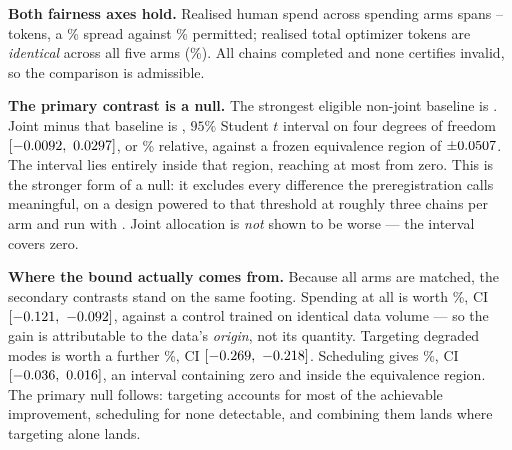 \documentclass{article}
\begin{document}
\textbf{Both fairness axes hold.} Realised human spend across spending arms spans
\PilotMatchedLow{}--\PilotMatchedHigh{} tokens, a \PilotHumanSpreadPct\% spread against
\PilotSpreadPermittedPct\% permitted; realised total optimizer tokens are \emph{identical}
across all five arms (\PilotTotalSpreadExactPct\%). All \PilotChains{} chains completed and
none certifies invalid, so the comparison is admissible.

\begin{table}[t]
\centering
\caption{\textbf{Targeting bounds the failure; scheduling does not.} All arms are matched on
both budget axes, so every row is comparable. AUC regret is the area under the
generation-wise held-out NLL-regret curve against each chain's own generation~0; tail
retention is the confirmatory outcome at the final generation. Bold marks the best value per
column, with both arms bolded where they tie at displayed precision --- selection-only and
joint are indistinguishable on both outcomes.}
\label{tab:results}
{\small}
\end{table}

\textbf{The primary contrast is a null.} The strongest eligible non-joint baseline is
\PilotPrimaryBaseline{}. Joint minus that baseline is \PilotPrimaryMean{}, $95\%$ Student
$t$ interval on four degrees of freedom $[\PilotPrimaryLow,\allowbreak\ \PilotPrimaryHigh]$, or
\PilotPrimaryPct\% relative, against a frozen equivalence region of
$\pm0.0507{}$. The interval lies entirely inside that region, reaching at most
\PilotPrimaryReach{} from zero. This is the stronger form of a null: it excludes every
difference the preregistration calls meaningful, on a design powered to that threshold at
roughly three chains per arm and run with \PilotSeeds{}. Joint allocation is \emph{not}
shown to be worse --- the interval covers zero.

\textbf{Where the bound actually comes from.} Because all arms are matched, the secondary
contrasts stand on the same footing. Spending at all is worth \PilotRandNonePct\%,
CI $[\PilotRandNoneLow,\allowbreak\ \PilotRandNoneHigh]$, against a control trained on identical data
volume --- so the gain is attributable to the data's \emph{origin}, not its quantity.
Targeting degraded modes is worth a further \PilotSelRandPct\%,
CI $[\PilotSelRandLow,\allowbreak\ \PilotSelRandHigh]$. Scheduling gives \PilotSchedRandPct\%,
CI $[\PilotSchedRandLow,\allowbreak\ \PilotSchedRandHigh]$, an interval containing zero and inside the
equivalence region. The primary null follows: targeting accounts for most of the achievable
improvement, scheduling for none detectable, and combining them lands where targeting alone
lands.
\end{document}
